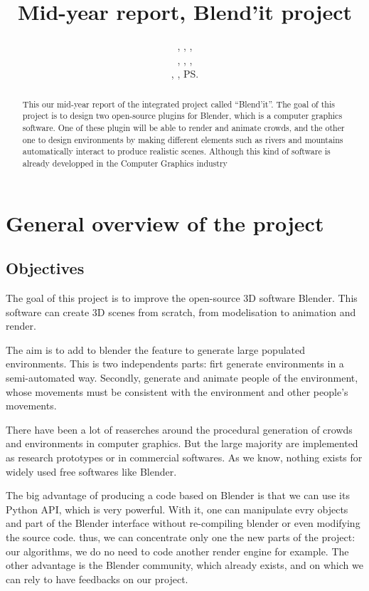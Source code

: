 \documentclass[a4paper,11pt]{article}
\title{Mid-year report, Blend'it project}
\author{\bb, \gc, \dl,\\ \vl, \om, \mr,\\ \me, \js, \ps}
\begin{document}
\maketitle

\begin{abstract}
This our mid-year report of the integrated project called ``Blend'it''. The goal of this project is to design two open-source plugins for Blender, which is a computer graphics software. One of these plugin will be able to render and animate crowds, and the other one to design environments by making different elements such as rivers and mountains automatically interact to produce realistic scenes. Although this kind of software is already developped in the Computer Graphics industry
\end{abstract}


\tableofcontents

\section{General overview of the project}

\subsection{Objectives}
The goal of this project is to improve the open-source 3D software Blender. This software can create 3D scenes from scratch, from modelisation to animation and render.

The aim is to add to blender the feature to generate large populated environments. This is two independents parts: firt generate environments in a semi-automated way. Secondly, generate and animate people of the environment, whose movements must be consistent with the environment and other people's movements.

There have been a lot of reaserches around the procedural generation of crowds and environments in computer graphics. But the large majority are implemented as research prototypes or in commercial softwares. As we know, nothing exists for widely used free softwares like Blender.

The big advantage of producing a code based on Blender is that we can use its Python API, which is very powerful. With it, one can manipulate evry objects and part of the Blender interface without re-compiling blender or even modifying the source code. thus, we can concentrate only one the new parts of the project: our algorithms, we do no need to code another render engine for example.
The other advantage is the Blender community, which already exists, and on which we can rely to have feedbacks on our project.
\end{document}
